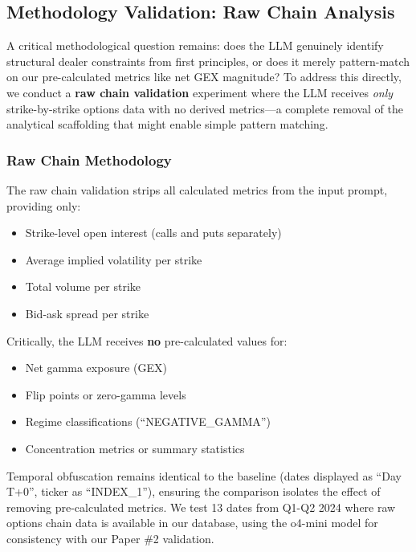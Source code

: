 \subsection{Methodology Validation: Raw Chain Analysis}
\label{subsec:raw-chain-validation}

A critical methodological question remains: does the LLM genuinely identify structural dealer constraints from first principles, or does it merely pattern-match on our pre-calculated metrics like net GEX magnitude? To address this directly, we conduct a \textbf{raw chain validation} experiment where the LLM receives \textit{only} strike-by-strike options data with no derived metrics—a complete removal of the analytical scaffolding that might enable simple pattern matching.

\subsubsection{Raw Chain Methodology}

The raw chain validation strips all calculated metrics from the input prompt, providing only:
\begin{itemize}
    \item Strike-level open interest (calls and puts separately)
    \item Average implied volatility per strike
    \item Total volume per strike
    \item Bid-ask spread per strike
\end{itemize}

Critically, the LLM receives \textbf{no} pre-calculated values for:
\begin{itemize}
    \item Net gamma exposure (GEX)
    \item Flip points or zero-gamma levels
    \item Regime classifications (``NEGATIVE\_GAMMA'')
    \item Concentration metrics or summary statistics
\end{itemize}

Temporal obfuscation remains identical to the baseline (dates displayed as ``Day T+0'', ticker as ``INDEX\_1''), ensuring the comparison isolates the effect of removing pre-calculated metrics. We test 13 dates from Q1-Q2 2024 where raw options chain data is available in our database, using the o4-mini model for consistency with our Paper \#2 validation.


